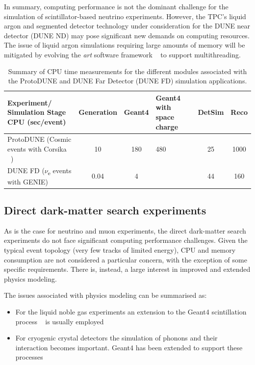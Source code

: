\documentclass[12pt,a4paper]{article}
\begin{document}
{In summary, computing performance is not the dominant challenge for the
simulation of scintillator-based neutrino experiments. However, the
TPC's liquid argon and segmented detector technology under consideration
for the DUNE near detector (DUNE ND) may pose significant new demands on
computing resources. The issue of liquid argon simulations requiring
large amounts of memory will be mitigated by evolving the \emph{art}
software framework ~\cite{Green:2012gv} to support multithreading.


\begin{table}[tbhp]
\centering
\begin{tabular}{| p{3.5cm} | c | c | p{2.5cm} | c | c |}
\hline
Experiment/ Simulation Stage CPU (sec/event) & Generation & Geant4 
& Geant4 with space charge & DetSim & Reco \\ \hline
ProtoDUNE (Cosmic events with Corsika ~\cite{Heck:1998vt}) & 10 & 180  & 
480 & 25 & 1000 \\ \hline
DUNE FD ($\nu$\textsubscript{e} events with GENIE) & 0.04 & 4 &   & 
44 & 160 \\ \hline
\end{tabular}
\caption{Summary of CPU time measurements for the different
modules associated with the ProtoDUNE and DUNE Far Detector (DUNE FD)
simulation applications.}
\label{table:cpudune}
\end{table}

\hypertarget{direct-dark-matter-search-experiments}{%
\subsection{Direct dark-matter search
experiments}\label{direct-dark-matter-search-experiments}}

As is the case for neutrino and muon experiments, the direct dark-matter
search experiments do not face significant computing performance
challenges. Given the typical event topology (very few tracks of limited
energy), CPU and memory consumption are not considered a particular
concern, with the exception of some specific requirements. There is,
instead, a large interest in improved and extended physics modeling.

The issues associated with physics modeling can be summarised as:

\begin{itemize}
\item
  For the liquid noble gas experiments an extension to the Geant4
  scintillation process ~\cite{1748-0221-6-10-P10002} is usually employed
\item
  For cryogenic crystal detectors the simulation of phonons and their
  interaction becomes important. Geant4 has been extended to support
  these processes ~\cite{Brandt:2014imy}
\end{itemize}

}
\end{document}
